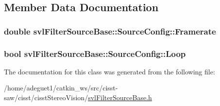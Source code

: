 \subsection{Member Data Documentation}
\hypertarget{classsvl_filter_source_base_1_1_source_config_aa91946e246f802e4fdf7691e6a3c9fa6}{
\subsubsection[{Framerate}]{\setlength{\rightskip}{0pt plus 5cm}double svl\-Filter\-Source\-Base\-::\-Source\-Config\-::\-Framerate}}\label{classsvl_filter_source_base_1_1_source_config_aa91946e246f802e4fdf7691e6a3c9fa6}
\hypertarget{classsvl_filter_source_base_1_1_source_config_aab00181cb4a94ee89f364f50597f7c9e}{
\subsubsection[{Loop}]{\setlength{\rightskip}{0pt plus 5cm}bool svl\-Filter\-Source\-Base\-::\-Source\-Config\-::\-Loop}}\label{classsvl_filter_source_base_1_1_source_config_aab00181cb4a94ee89f364f50597f7c9e}


The documentation for this class was generated from the following file\-:\begin{DoxyCompactItemize}
\item 
/home/adeguet1/catkin\-\_\-ws/src/cisst-\/saw/cisst/cisst\-Stereo\-Vision/\hyperlink{svl_filter_source_base_8h}{svl\-Filter\-Source\-Base.\-h}\end{DoxyCompactItemize}
